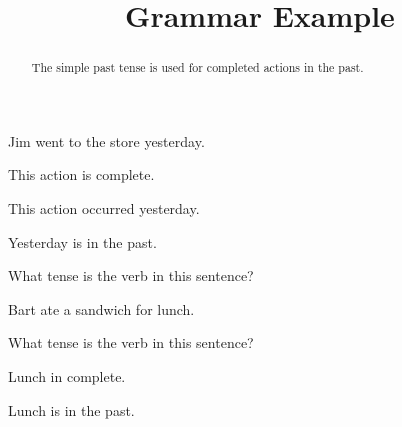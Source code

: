 \documentclass{ximera}
\title{Grammar Example}
\begin{document}
\begin{abstract}
The simple past tense is used for completed actions in the past.
\end{abstract}
\maketitle

\begin{question}
Jim went to the store yesterday.

\begin{solution}
\begin{hint}
This action is complete.
\end{hint}
\begin{hint}
This action occurred yesterday.
\end{hint}
\begin{hint}
Yesterday is in the past.
\end{hint}
What tense is the verb in this sentence?
\end{solution}
\end{question}

\begin{question}
Bart ate a sandwich for lunch.
\begin{solution}
What tense is the verb in this sentence?
\begin{multiple-choice}
\end{multiple-choice}
\begin{hint}
Lunch in complete.
\end{hint}
\begin{hint}
Lunch is in the past.
\end{hint}
\end{solution}
\end{question}
\end{document}

